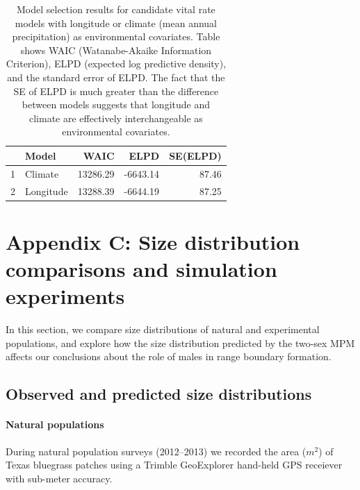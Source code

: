 \documentclass[11pt]{article}
\begin{document}
\newpage
\begin{table}[ht]
	\centering
	\begin{tabular}{rlrrr}
		\hline
		& Model & WAIC & ELPD & SE(ELPD) \\ 
		\hline
		1 & Climate & 13286.29 & -6643.14 & 87.46 \\ 
		2 & Longitude & 13288.39 & -6644.19 & 87.25 \\ 
		\hline
	\end{tabular}
	\caption{Model selection results for candidate vital rate models with longitude or climate (mean annual precipitation) as environmental covariates. Table shows WAIC (Watanabe-Akaike Information Criterion), ELPD (expected log predictive density), and the standard error of ELPD. The fact that the SE of ELPD is much greater than the difference between models suggests that longitude and climate are effectively interchangeable as environmental covariates.} 
	\label{tab:waic}
\end{table}

\newpage
\section*{Appendix C: Size distribution comparisons and simulation experiments}
\renewcommand{\thefigure}{C\arabic{figure}}\setcounter{figure}{0}
\renewcommand{\thetable}{C\arabic{table}}\setcounter{table}{0}
\renewcommand{\theequation}{C\arabic{equation}}\setcounter{equation}{0}

In this section, we compare size distributions of natural and experimental populations, and explore how the size distribution predicted by the two-sex MPM affects our conclusions about the role of males in range boundary formation. 

\subsection*{Observed and predicted size distributions}

\paragraph{Natural populations}
During natural population surveys (2012--2013) we recorded the area ($m^2$) of Texas bluegrass patches using a Trimble GeoExplorer hand-held GPS receiever with sub-meter accuracy. 
\end{document}
